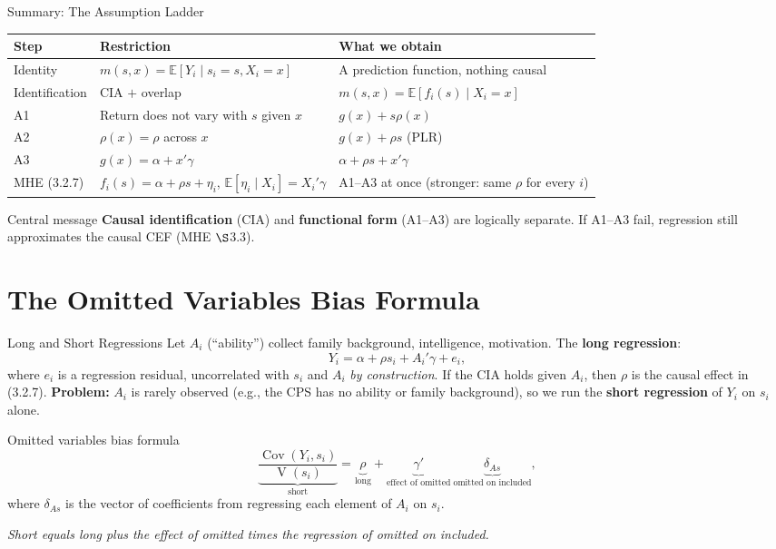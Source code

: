 \documentclass[aspectratio=169,11pt]{beamer}
\newcommand{\E}{\mathbb{E}}
\newcommand{\Var}{\operatorname{V}}
\newcommand{\Cov}{\operatorname{Cov}}
\begin{document}
\begin{frame}{Summary: The Assumption Ladder}
\small
\renewcommand{\arraystretch}{1.18}
\begin{tabular}{@{}L{2.50cm}L{5.4cm}L{5.2cm}@{}}
\toprule
\textbf{Step} & \textbf{Restriction} & \textbf{What we obtain}\\
\midrule
Identity & $m(s,x)=\E[Y_i\mid s_i=s,X_i=x]$ & A prediction function, nothing causal\\
Identification & CIA $+$ overlap & $m(s,x)=\E[f_i(s)\mid X_i=x]$\\
A1 & Return does not vary with $s$ given $x$ & $g(x)+s\rho(x)$\\
A2 & $\rho(x)=\rho$ across $x$ & $g(x)+\rho s$ (PLR)\\
A3 & $g(x)=\alpha+x'\gamma$ & $\alpha+\rho s+x'\gamma$\\
\midrule
MHE (3.2.7) & $f_i(s)=\alpha+\rho s+\eta_i$, $\E[\eta_i\mid X_i]=X_i'\gamma$ & A1--A3 at once (stronger: same $\rho$ for every $i$)\\
\bottomrule
\end{tabular}
\medskip
\begin{block}{Central message}
\textbf{Causal identification} (CIA) and \textbf{functional form} (A1--A3) are logically separate.
If A1--A3 fail, regression still approximates the causal CEF (MHE \ensuremath{\S}3.3).
\end{block}
\end{frame}

\section{The Omitted Variables Bias Formula}
\begin{frame}{Long and Short Regressions}
\small
Let $A_i$ (``ability'') collect family background, intelligence, motivation. The \textbf{long regression}:
\[
Y_i=\alpha+\rho s_i+A_i'\gamma+e_i,
\tag{3.2.10}
\]
where $e_i$ is a regression residual, uncorrelated with $s_i$ and $A_i$ \emph{by construction}.
If the CIA holds given $A_i$, then $\rho$ is the causal effect in (3.2.7).
\medskip
\textbf{Problem:} $A_i$ is rarely observed (e.g., the CPS has no ability or family background), so we run the \textbf{short regression} of $Y_i$ on $s_i$ alone.
\begin{block}{Omitted variables bias formula}
\vspace{-0.4em}
\[
\underbrace{\frac{\Cov(Y_i,s_i)}{\Var(s_i)}}_{\text{short}}
=\underbrace{\rho}_{\text{long}}+\underbrace{\gamma'}_{\text{effect of omitted}}\ \underbrace{\delta_{As}}_{\text{omitted on included}},
\tag{3.2.11}
\]
where $\delta_{As}$ is the vector of coefficients from regressing each element of $A_i$ on $s_i$.
\end{block}
\centering
\textit{Short equals long plus the effect of omitted times the regression of omitted on included.}
\end{frame}
\end{document}
